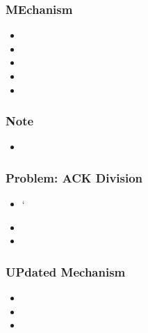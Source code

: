 \documentclass[a4paper]{article}
\begin{document}
\subsubsection{MEchanism}
\begin{itemize}
	\item
	\item
	\item
	\item
	\item
\end{itemize}
\subsubsection{Note}
\begin{itemize}
	\item
\end{itemize}
\subsubsection{Problem: ACK Division}
\begin{itemize}
	\item `
	\item
	\item
\end{itemize}
\subsubsection{UPdated Mechanism}
\begin{itemize}
	\item
	\item
	\item
\end{itemize}
\end{document}
